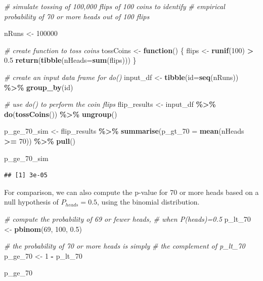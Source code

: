 \documentclass[
  12pt,
]{book}
\newenvironment{Shaded}{\begin{snugshade}}{\end{snugshade}}
\newcommand{\AttributeTok}[1]{\textcolor[rgb]{0.13,0.29,0.53}{#1}}
\newcommand{\CommentTok}[1]{\textcolor[rgb]{0.56,0.35,0.01}{\textit{#1}}}
\newcommand{\ControlFlowTok}[1]{\textcolor[rgb]{0.13,0.29,0.53}{\textbf{#1}}}
\newcommand{\DecValTok}[1]{\textcolor[rgb]{0.00,0.00,0.81}{#1}}
\newcommand{\FloatTok}[1]{\textcolor[rgb]{0.00,0.00,0.81}{#1}}
\newcommand{\FunctionTok}[1]{\textcolor[rgb]{0.13,0.29,0.53}{\textbf{#1}}}
\newcommand{\NormalTok}[1]{#1}
\newcommand{\OtherTok}[1]{\textcolor[rgb]{0.56,0.35,0.01}{#1}}
\newcommand{\SpecialCharTok}[1]{\textcolor[rgb]{0.81,0.36,0.00}{\textbf{#1}}}
\begin{document}
\begin{Shaded}
\begin{Highlighting}[]
\CommentTok{\# simulate tossing of 100,000 flips of 100 coins to identify }
\CommentTok{\# empirical probability of 70 or more heads out of 100 flips}

\NormalTok{nRuns }\OtherTok{\textless{}{-}} \DecValTok{100000}

\CommentTok{\# create function to toss coins}
\NormalTok{tossCoins }\OtherTok{\textless{}{-}} \ControlFlowTok{function}\NormalTok{() \{}
\NormalTok{  flips }\OtherTok{\textless{}{-}} \FunctionTok{runif}\NormalTok{(}\DecValTok{100}\NormalTok{) }\SpecialCharTok{\textgreater{}} \FloatTok{0.5} 
  \FunctionTok{return}\NormalTok{(}\FunctionTok{tibble}\NormalTok{(}\AttributeTok{nHeads=}\FunctionTok{sum}\NormalTok{(flips)))}
\NormalTok{\}}

\CommentTok{\# create an input data frame for do()}
\NormalTok{input\_df }\OtherTok{\textless{}{-}} \FunctionTok{tibble}\NormalTok{(}\AttributeTok{id=}\FunctionTok{seq}\NormalTok{(nRuns)) }\SpecialCharTok{\%\textgreater{}\%}
  \FunctionTok{group\_by}\NormalTok{(id)}

\CommentTok{\# use do() to perform the coin flips}
\NormalTok{flip\_results }\OtherTok{\textless{}{-}}\NormalTok{ input\_df }\SpecialCharTok{\%\textgreater{}\%}
  \FunctionTok{do}\NormalTok{(}\FunctionTok{tossCoins}\NormalTok{()) }\SpecialCharTok{\%\textgreater{}\%}
  \FunctionTok{ungroup}\NormalTok{()}

\NormalTok{p\_ge\_70\_sim }\OtherTok{\textless{}{-}} 
\NormalTok{  flip\_results }\SpecialCharTok{\%\textgreater{}\%}
  \FunctionTok{summarise}\NormalTok{(}\AttributeTok{p\_gt\_70 =} \FunctionTok{mean}\NormalTok{(nHeads }\SpecialCharTok{\textgreater{}=} \DecValTok{70}\NormalTok{)) }\SpecialCharTok{\%\textgreater{}\%}
  \FunctionTok{pull}\NormalTok{()}

\NormalTok{p\_ge\_70\_sim}
\end{Highlighting}
\end{Shaded}

\begin{verbatim}
## [1] 3e-05
\end{verbatim}

For comparison, we can also compute the p-value for 70 or more heads based on a null hypothesis of \(P_{heads}=0.5\), using the binomial distribution.

\begin{Shaded}
\begin{Highlighting}[]
\CommentTok{\# compute the probability of 69 or fewer heads, }
\CommentTok{\# when P(heads)=0.5}
\NormalTok{p\_lt\_70 }\OtherTok{\textless{}{-}} \FunctionTok{pbinom}\NormalTok{(}\DecValTok{69}\NormalTok{, }\DecValTok{100}\NormalTok{, }\FloatTok{0.5}\NormalTok{) }

\CommentTok{\# the probability of 70 or more heads is simply }
\CommentTok{\# the complement of p\_lt\_70}
\NormalTok{p\_ge\_70 }\OtherTok{\textless{}{-}} \DecValTok{1} \SpecialCharTok{{-}}\NormalTok{ p\_lt\_70}

\NormalTok{p\_ge\_70}
\end{Highlighting}
\end{Shaded}
\end{document}
